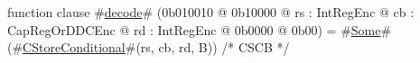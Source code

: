 function clause #\hyperref[sailMIPSzdecode]{decode}# (0b010010 @ 0b10000 @ rs : IntRegEnc @ cb : CapRegOrDDCEnc @ rd : IntRegEnc @ 0b0000 @ 0b00) = #\hyperref[sailMIPSzSome]{Some}#(#\hyperref[sailMIPSzCStoreConditional]{CStoreConditional}#(rs, cb, rd, B)) /* CSCB */
